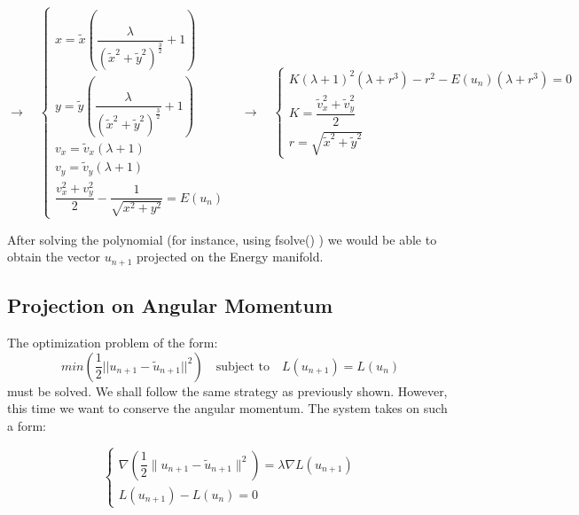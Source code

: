 \documentclass[11pt]{article}
\begin{document}
\[
\rightarrow \quad
\begin{cases}
x = \tilde{x} \left( \dfrac{\lambda}{(\tilde{x}^2 + \tilde{y}^2)^\frac{3}{2}} + 1 \right) \\[10pt]
y = \tilde{y} \left( \dfrac{\lambda}{(\tilde{x}^2 + \tilde{y}^2)^\frac{3}{2}} + 1 \right) \\[10pt]
v_x = \tilde{v}_x (\lambda + 1) \\[10pt]
v_y = \tilde{v}_y (\lambda + 1) \\[10pt]
\dfrac{v_x^2 + v_y^2}{2} - \dfrac{1}{\sqrt{x^2 + y^2}} = E(u_n)
\end{cases}
\quad \rightarrow \quad
\begin{cases}
    K(\lambda + 1)^2 (\lambda + r^3) - r^2 - E(u_n)(\lambda + r^3) = 0 \\[10pt]
    K = \dfrac{\tilde{v}_x^2 + \tilde{v}_y^2}{2}\\[10pt]
    r = \sqrt{\tilde{x}^2 + \tilde{y}^2}
\end{cases}
\]

After solving the polynomial (for instance, using fsolve() ) we would be able to obtain the vector $u_{n+1}$ projected on the Energy manifold.


\subsection{Projection on Angular Momentum}

The optimization problem of the form:
\[
min(\frac{1}{2}||u_{n+1}-\tilde{u}_{n+1}||^2) \quad \text{subject to} \quad L(u_{n+1}) = L(u_n)
\]
must be solved.
We shall follow the same strategy as previously shown. However, this time we want to conserve the angular momentum. The system takes on such a form:

\[
\begin{cases}
\nabla\left( \dfrac{1}{2} \| u_{n+1} - \tilde{u}_{n+1} \|^2 \right) = \lambda \nabla L(u_{n+1}) \\[10pt]
L(u_{n+1}) - L(u_n) = 0
\end{cases}
\]
\end{document}
